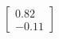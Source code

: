 \documentclass[preview]{standalone}
\begin{document}
\begin{align*}
\begin{bmatrix} 0.82 \\ -0.11 \end{bmatrix}
\end{align*}
\end{document}
